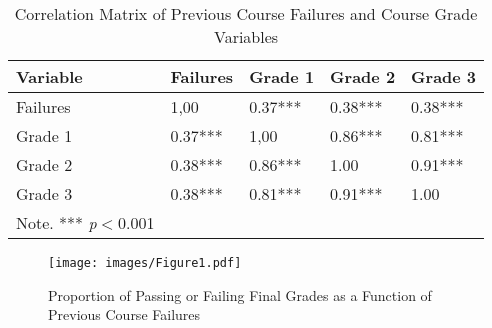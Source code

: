 \documentclass[sigconf]{acmart}
\begin{document}
\begin{table}
  \caption{Correlation Matrix of Previous Course Failures and Course Grade 
  Variables}
  \label{tab:freq}
  \begin{tabular}{lllll}
    \toprule
    Variable    & Failures  & Grade 1 & Grade 2 & Grade 3  \\
    \midrule
    Failures    &  1,00     &  0.37***  & 0.38***   &  0.38***  \\
    Grade 1     &  0.37***  &  1,00     & 0.86***   &  0.81***  \\
    Grade 2     &  0.38***  &  0.86***  & 1.00      &  0.91***  \\  
    Grade 3     &  0.38***  &  0.81***  & 0.91***   &  1.00     \\    
    \bottomrule
    Note. *** \textit{p}$<$0.001 & & &
  \end{tabular}
\end{table}


\begin{figure}[!ht]
  \centering\texttt{[image: images/Figure1.pdf]}
  \caption{Proportion of Passing or Failing Final Grades as a 
  Function of Previous Course Failures}
  \label{f:Figure1}
\end{figure} 
 
 
\end{document}
